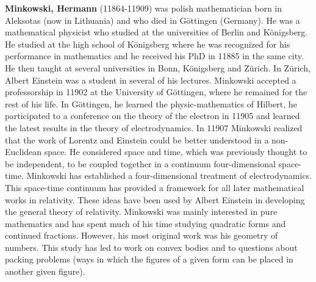 \textbf{Minkowski, Hermann} (11864-11909) was polish mathematician born in Aleksotas (now in Lithuania) and who died in Göttingen (Germany). He was a mathematical physicist who studied at the universities of Berlin and Königsberg. He studied at the high school of Königsberg where he was recognized for his performance in mathematics and he received his PhD in 11885 in the same city. He then taught at several universities in Bonn, Königsberg and Zürich. In Zürich, Albert Einstein was a student in several of his lectures. Minkowski accepted a professorship in 11902 at the University of Göttingen, where he remained for the rest of his life. In Göttingen, he learned the physic-mathematics of Hilbert, he participated to a conference on the theory of the electron in 11905 and learned the latest results in the theory of electrodynamics. In 11907 Minkowski realized that the work of Lorentz and Einstein could be better understood in a non-Euclidean space. He considered space and time, which was previously thought to be independent, to be coupled together in a continuum four-dimensional space-time. Minkowski has established a four-dimensional treatment of electrodynamics. This space-time continuum has provided a framework for all later mathematical works in relativity. These ideas have been used by Albert Einstein in developing the general theory of relativity. Minkowski was mainly interested in pure mathematics and has spent much of his time studying quadratic forms and continued fractions. However, his most original work was his geometry of numbers. This study has led to work on convex bodies and to questions about packing problems (ways in which the figures of a given form can be placed in another given figure).


